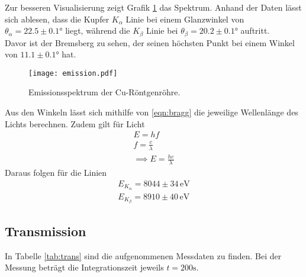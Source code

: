 \noindent Zur besseren Visualisierung zeigt Grafik \ref{fig:emission}
das Spektrum. Anhand der Daten lässt sich ablesen, dass die Kupfer 
$K_\alpha$ Linie bei einem Glanzwinkel von $\theta_\alpha = 22.5 \pm 0.1°$ liegt,
während die $K_\beta$ Linie bei $\theta_\beta = 20.2 \pm 0.1 °$ auftritt.\\
Davor ist der Bremsberg zu sehen, der seinen höchsten Punkt bei einem
Winkel von $11.1 \pm 0.1°$ hat. 

\begin{figure}
    \centering
    \texttt{[image: emission.pdf]}
    \caption{Emissionsspektrum der Cu-Röntgenröhre.}
    \label{fig:emission}
\end{figure}

\noindent Aus den Winkeln lässt sich mithilfe von \eqref{eqn:bragg}
die jeweilige Wellenlänge des Lichts berechnen. Zudem gilt für Licht
\begin{align*}
    E = h f \\
    f = \frac{c}{\lambda}\\
    \implies E = \frac{h c}{\lambda}
\end{align*}
Daraus folgen für die Linien
\begin{align*}
    E_{K_\alpha} = 8044 \pm 34 \, \mathrm{eV}\\
    E_{K_\beta} = 8910 \pm 40 \, \mathrm{eV}
\end{align*}

\subsection{Transmission}

In Tabelle \ref{tab:trans} sind die aufgenommenen Messdaten zu finden. Bei 
der Messung beträgt die Integrationszeit jeweils $t = 200 \si{\s}$.


